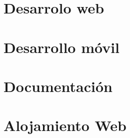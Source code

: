    
   \section{Desarrolo web}\label{algoritmo}
   
   \section{Desarrollo móvil}\label{dapp}
   
   \section{Documentación}\label{docs}
   
   \section{Alojamiento Web}\label{alojamiento}
 
 